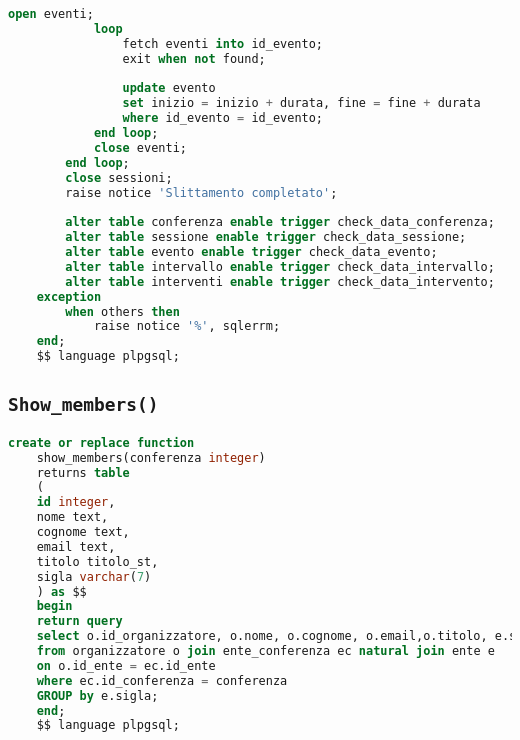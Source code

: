 \begin{lstlisting}[language=SQL, style=mystyle]
			open eventi;
			loop
				fetch eventi into id_evento;
				exit when not found;
	
				update evento
				set inizio = inizio + durata, fine = fine + durata
				where id_evento = id_evento;
			end loop;
			close eventi;
		end loop;
		close sessioni;
		raise notice 'Slittamento completato';
	
		alter table conferenza enable trigger check_data_conferenza;
		alter table sessione enable trigger check_data_sessione;
		alter table evento enable trigger check_data_evento;
		alter table intervallo enable trigger check_data_intervallo;
		alter table interventi enable trigger check_data_intervento;
	exception
		when others then
			raise notice '%', sqlerrm;
	end;
	$$ language plpgsql;
\end{lstlisting}

\subsection{\texttt{Show\_members()}}
\begin{lstlisting}[language=SQL, style=mystyle]
	create or replace function 
	show_members(conferenza integer)
	returns table 
	(
	id integer, 
	nome text, 
	cognome text, 
	email text,
	titolo titolo_st, 
	sigla varchar(7)
	) as $$
	begin
	return query
	select o.id_organizzatore, o.nome, o.cognome, o.email,o.titolo, e.sigla
	from organizzatore o join ente_conferenza ec natural join ente e  
	on o.id_ente = ec.id_ente
	where ec.id_conferenza = conferenza
	GROUP by e.sigla;
	end;
	$$ language plpgsql;
\end{lstlisting}